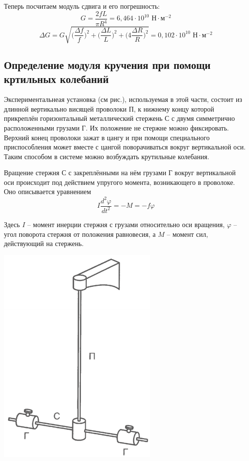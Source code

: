 \documentclass[a4paper, 12pt]{article} %
\begin{document}
Теперь посчитаем модуль сдвига и его погрешность:
\[G = \frac{2fL}{\pi R^4} = 6,464 \cdot 10^{10}\text{ Н} \cdot \text{м}^{-2}\]
\[\Delta G = G \sqrt{\Big( \frac{\Delta f}{f}\Big) ^2 + \Big(\frac{\Delta L}{L} \Big)^2 + \Big(4\frac{\Delta R}{R} \Big)^2}= 0,102 \cdot 10^{10}\text{ Н} \cdot \text{м}^{-2}\]

\subsection{Определение модуля кручения при помощи кртильных колебаний}

Экспериментальнеая установка (см рис.), используемая в этой части, состоит из длинной вертикально висящей проволоки П, к нижнему концу которой прикреплён горизонтальный металлический стержень С с двумя симметрично расположенными грузами Г. Их положение не стержне можно фиксировать. Верхний конец проволоки зажат в цангу и при помощи специального приспособления может вместе с цангой поворачиваться вокруг вертикальной оси. Таким способом в системе можно возбуждать крутильные колебания. 

Вращение стержня С с закреплёнными на нём грузами Г вокруг вертикальной оси происходит под действием упругого момента, возникающего в проволоке. Оно описывается уравнением
\[I \frac{d^2 \varphi}{d t^2} = -M = -f \varphi\]

Здесь $I$ -- момент инерции стержня с грузами относительно оси вращения, $\varphi$ -- угол поворота стержня от положения равновесия, а $M$ -- момент сил, действующий на стержень. 

\begin{center}
	{\includegraphics[width=8cm]{3}}
\end{center}
\end{document}
